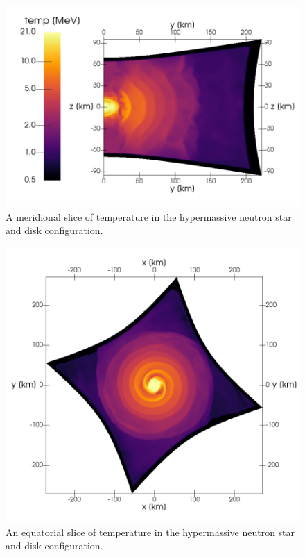 \documentclass[aps,floatfix,prd,superscriptaddress,twocolumn]{revtex4-1}
\begin{document}
\begin{figure}
  \includegraphics[width=\columnwidth]{production-colormap-merid-temp}
  \caption{A meridional slice of temperature in the hypermassive neutron
    star and disk configuration.}
  \label{fig:nsns_temp_merid}
\end{figure}

\begin{figure}
  \includegraphics[width=\columnwidth]{production-colormap-equat-temp}
  \caption{An equatorial slice of temperature in the hypermassive neutron
    star and disk configuration.}
  \label{fig:nsns_temp_equat}
\end{figure}
\end{document}
